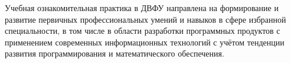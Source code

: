 \documentclass[../document.tex]{subfiles}
\begin{document}
    \par Учебная ознакомительная практика в ДВФУ направлена на формирование и развитие первичных профессиональных умений и навыков в сфере избранной специальности, в том числе в области разработки программных продуктов с применением современных информационных технологий с учётом тенденции развития программирования и математического обеспечения.
\end{document}
